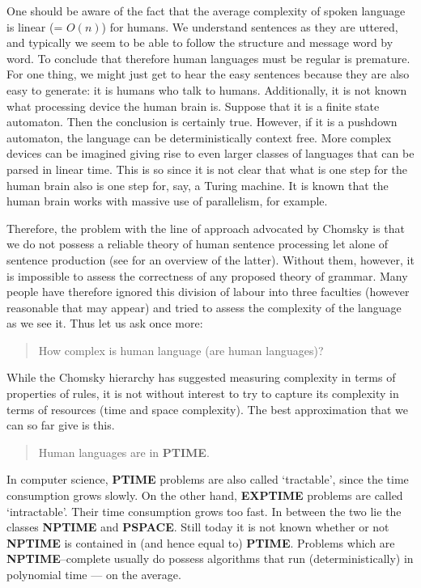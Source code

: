 One should be aware of the fact that the average complexity of 
spoken language is linear (= $O(n)$) for humans. We understand 
sentences as they are uttered, and typically we seem to be able 
to follow the structure and message word by word. To conclude that 
therefore human languages must be regular is premature. For one 
thing, we might just get to hear the easy sentences because they 
are also easy to generate: it is humans who talk to humans. Additionally, 
it is not known what processing device the human brain is. Suppose 
that it is a finite state automaton. Then the conclusion is 
certainly true. However, if it is a pushdown automaton, the language 
can be deterministically context free. More complex devices can be 
imagined giving rise to even larger classes of languages that can 
be parsed in linear time. This is so since it is not clear that what 
is one step for the human brain also is one step for, say, a Turing 
machine. It is known that the human brain works with massive use of 
parallelism, for example.

Therefore, the problem with the line of approach advocated by
Chomsky is that we do not possess a reliable theory of human
sentence processing let alone of sentence production (see
\cite{levelt:speaking} for an overview of the latter).
Without them, however, it is impossible to assess the
correctness of any proposed theory of grammar. Many people have
therefore ignored this division of labour into three faculties
(however reasonable that may appear) and tried to assess the
complexity of the language as we see it. Thus let us ask once
more:
\begin{quote}
How complex is human language (are human languages)?
\end{quote}
While the Chomsky hierarchy has suggested measuring complexity in
terms of properties of rules, it is not without interest to try to
capture its complexity in terms of resources (time and space
complexity). The best approximation that we can so far give is this. 
\begin{quote}
Human languages are in \textbf{PTIME}.
\end{quote}
In computer science, \textbf{PTIME} problems are also called `tractable',
since the time consumption grows slowly. On the other hand,
\textbf{EXPTIME} problems are called `intractable'. Their time
consumption grows too fast. In between the two lie the classes
\textbf{NPTIME} and \textbf{PSPACE}. Still today it is not known whether
or not \textbf{NPTIME} is contained in (and hence equal to) \textbf{PTIME}.
Problems which are \textbf{NPTIME}--complete usually do possess algorithms 
that run (deterministically) in polynomial time --- on the average.

